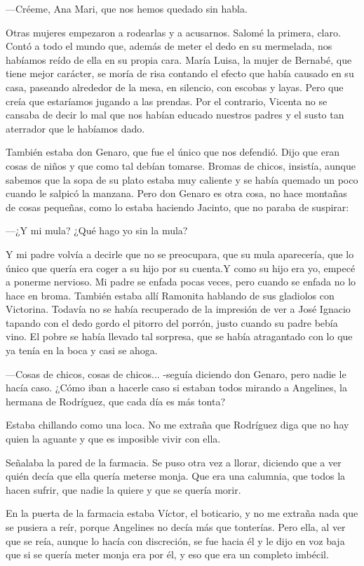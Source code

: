\documentclass{barcodevapor3pags}
\begin{document}
---Créeme, Ana Mari, que nos hemos quedado sin habla.~

Otras mujeres empezaron a rodearlas y a acusarnos. Salomé la primera,
claro. Contó a todo el mundo que, además de meter el dedo en su
mermelada, nos habíamos reído de ella en su propia cara. María Luisa, la
mujer de Bernabé, que tiene mejor carácter, se moría de risa contando el
efecto que había causado en su casa, paseando alrededor de la mesa, en
silencio, con escobas y layas. Pero que creía que estaríamos jugando a
las prendas. Por el contrario, Vicenta no se cansaba de decir lo mal que
nos habían educado nuestros padres y el susto tan aterrador que le
habíamos dado.~

También estaba don Genaro, que fue el único que nos defendió. Dijo que
eran cosas de niños y que como tal debían tomarse. Bromas de chicos,
insistía, aunque sabemos que la sopa de su plato estaba muy caliente y
se había quemado un poco cuando le salpicó la manzana. Pero don Genaro
es otra cosa, no hace montañas de cosas pequeñas, como lo estaba
haciendo Jacinto, que no paraba de suspirar:~

---¿Y mi mula? ¿Qué hago yo sin la mula?~

Y mi padre volvía a decirle que no se preocupara, que su mula
aparecería, que lo único que quería era coger a su hijo por su cuenta.Y como su hijo era yo, empecé a ponerme nervioso. Mi padre se enfada
pocas veces, pero cuando se enfada no lo hace en broma. También estaba
allí Ramonita hablando de sus gladiolos con Victorina. Todavía no se
había recuperado de la impresión de ver a José Ignacio tapando con el
dedo gordo el pitorro del porrón, justo cuando su padre bebía vino. El
pobre se había llevado tal sorpresa, que se había atragantado con lo que
ya tenía en la boca y casi se ahoga.~

---Cosas de chicos, cosas de chicos... -seguía diciendo don Genaro, pero
nadie le hacía caso. ¿Cómo iban a hacerle caso si estaban todos mirando
a Angelines, la hermana de Rodríguez, que cada día es más tonta?~

Estaba chillando como una loca. No me extraña que Rodríguez diga que no
hay quien la aguante y que es imposible vivir con ella.~

Señalaba la pared de la farmacia. Se puso otra vez a llorar, diciendo
que a ver quién decía que ella quería meterse monja. Que era una
calumnia, que todos la hacen sufrir, que nadie la quiere y que se quería
morir.~

En la puerta de la farmacia estaba Víctor, el boticario, y no me extraña
nada que se pusiera a reír, porque Angelines no decía más que tonterías.
Pero ella, al ver que se reía, aunque lo hacía con discreción, se fue
hacia él y le dijo en voz baja que si se quería meter monja era por él,
y eso que era un completo imbécil.~
\end{document}
